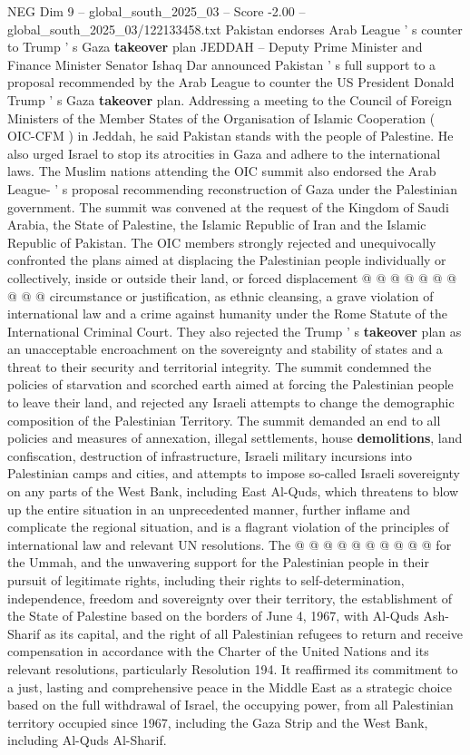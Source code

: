 \begin{textsample}{NEG Dim 9 – global\_south\_2025\_03 – Score -2.00 – global\_south\_2025\_03/122133458.txt}  \label{ex:f9_neg_319}
Pakistan endorses Arab League ' s counter to Trump ' s Gaza \textbf{takeover} plan JEDDAH -- Deputy Prime Minister and Finance Minister Senator Ishaq Dar announced Pakistan ' s full support to a proposal recommended by the Arab League to counter the US President Donald Trump ' s Gaza \textbf{takeover} plan.
Addressing a meeting to the Council of Foreign Ministers of the Member States of the Organisation of Islamic Cooperation ( OIC-CFM ) in Jeddah, he said Pakistan stands with the people of Palestine.
He also urged Israel to stop its atrocities in Gaza and adhere to the international laws.
The Muslim nations attending the OIC summit also endorsed the Arab League- ' s proposal recommending reconstruction of Gaza under the Palestinian government.
The summit was convened at the request of the Kingdom of Saudi Arabia, the State of Palestine, the Islamic Republic of Iran and the Islamic Republic of Pakistan.
The OIC members strongly rejected and unequivocally confronted the plans aimed at displacing the Palestinian people individually or collectively, inside or outside their land, or forced displacement @ @ @ @ @ @ @ @ @ @ circumstance or justification, as ethnic cleansing, a grave violation of international law and a crime against humanity under the Rome Statute of the International Criminal Court.
They also rejected the Trump ' s \textbf{takeover} plan as an unacceptable encroachment on the sovereignty and stability of states and a threat to their security and territorial integrity.
The summit condemned the policies of starvation and scorched earth aimed at forcing the Palestinian people to leave their land, and rejected any Israeli attempts to change the demographic composition of the Palestinian Territory.
The summit demanded an end to all policies and measures of annexation, illegal settlements, house \textbf{demolitions}, land confiscation, destruction of infrastructure, Israeli military incursions into Palestinian camps and cities, and attempts to impose so-called Israeli sovereignty on any parts of the West Bank, including East Al-Quds, which threatens to blow up the entire situation in an unprecedented manner, further inflame and complicate the regional situation, and is a flagrant violation of the principles of international law and relevant UN resolutions.
The @ @ @ @ @ @ @ @ @ @ for the Ummah, and the unwavering support for the Palestinian people in their pursuit of legitimate rights, including their rights to self-determination, independence, freedom and sovereignty over their territory, the establishment of the State of Palestine based on the borders of June 4, 1967, with Al-Quds Ash-Sharif as its capital, and the right of all Palestinian refugees to return and receive compensation in accordance with the Charter of the United Nations and its relevant resolutions, particularly Resolution 194.
It reaffirmed its commitment to a just, lasting and comprehensive peace in the Middle East as a strategic choice based on the full withdrawal of Israel, the occupying power, from all Palestinian territory occupied since 1967, including the Gaza Strip and the West Bank, including Al-Quds Al-Sharif.

\end{textsample}
